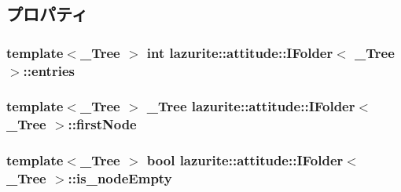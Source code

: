 \subsection{プロパティ}
\hypertarget{interfacelazurite_1_1attitude_1_1_i_folder_3_01___tree_01_4_ad666abfb54b714621d9eaa1f71f84a82}{
\subsubsection[{entries}]{\setlength{\rightskip}{0pt plus 5cm}template$<$\_\-Tree $>$ int lazurite::attitude::IFolder$<$ \_\-Tree $>$::entries}}
\label{interfacelazurite_1_1attitude_1_1_i_folder_3_01___tree_01_4_ad666abfb54b714621d9eaa1f71f84a82}
\hypertarget{interfacelazurite_1_1attitude_1_1_i_folder_3_01___tree_01_4_ab200f6b8a983e438c063561f19f782f2}{
\subsubsection[{firstNode}]{\setlength{\rightskip}{0pt plus 5cm}template$<$\_\-Tree $>$ \_\-Tree lazurite::attitude::IFolder$<$ \_\-Tree $>$::firstNode}}
\label{interfacelazurite_1_1attitude_1_1_i_folder_3_01___tree_01_4_ab200f6b8a983e438c063561f19f782f2}
\hypertarget{interfacelazurite_1_1attitude_1_1_i_folder_3_01___tree_01_4_a051fb4aa2f8a960d4a51ea5ff72aafe9}{
\subsubsection[{is\_\-nodeEmpty}]{\setlength{\rightskip}{0pt plus 5cm}template$<$\_\-Tree $>$ bool lazurite::attitude::IFolder$<$ \_\-Tree $>$::is\_\-nodeEmpty}}
